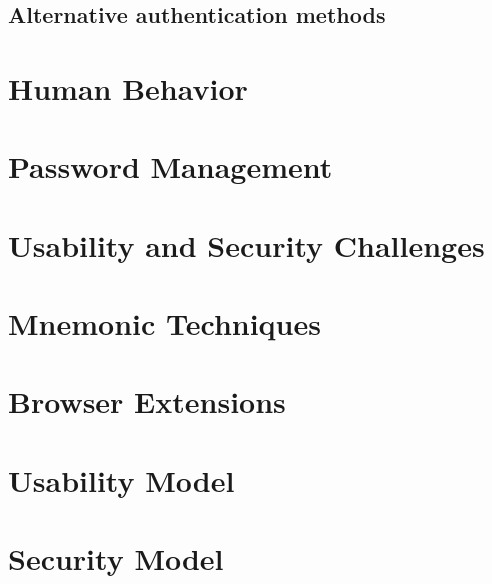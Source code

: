 \subsection{Alternative authentication methods}

\section{Human Behavior}

\section{Password Management}

\section{Usability and Security Challenges}

\section{Mnemonic Techniques}

\section{Browser Extensions}

\section{Usability Model}

\section{Security Model}




